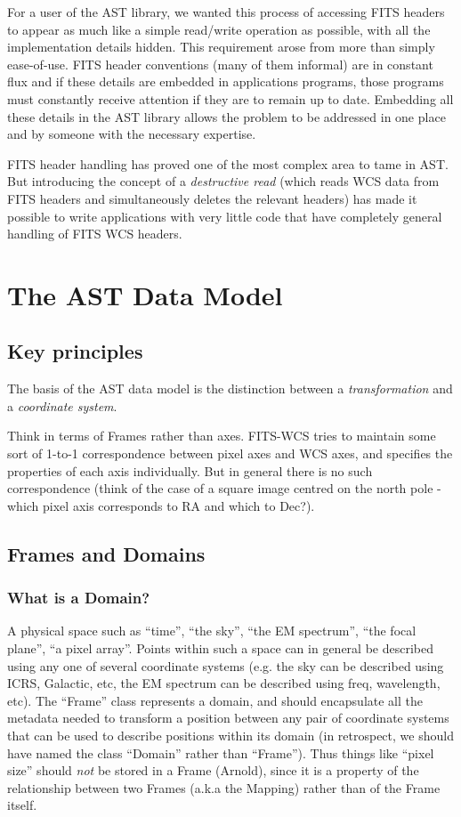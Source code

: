 \documentclass[final,authoryear,5p,times,twocolumn]{elsarticle}
\begin{document}
For a user of the AST library, we wanted this process of accessing FITS
headers to appear as much like a simple read/write operation as
possible, with all the implementation details hidden. This requirement
arose from more than simply ease-of-use. FITS header conventions (many
of them informal) are in constant flux and if these details are embedded
in applications programs, those programs must constantly receive
attention if they are to remain up to date. Embedding all these details
in the AST library allows the problem to be addressed in one place and
by someone with the necessary expertise.

FITS header handling has proved one of the most complex area to tame in AST.
But introducing the concept of a \emph{destructive read} (which reads WCS
data from FITS headers and simultaneously deletes the relevant headers)
has made it possible to write applications with very little code that
have completely general handling of FITS WCS headers.


\section{The AST Data Model}

\subsection{Key principles}

The basis of the AST data model is the distinction between a
\emph{transformation} and a \emph{coordinate system}.


Think in terms of Frames rather than axes. FITS-WCS tries to maintain
some sort of 1-to-1 correspondence between pixel axes and WCS axes,
and specifies the properties of each axis individually. But in general
there is no such correspondence (think of the case of a square image
centred on the north pole - which pixel axis corresponds to RA and
which to Dec?).

\subsection{Frames and Domains}

\subsubsection{What is a Domain?}

A physical space such as ``time'', ``the sky'', ``the EM spectrum'', ``the
focal plane'', ``a pixel array''. Points within such a space can in
general be described using any one of several coordinate systems
(e.g. the sky can be described using ICRS, Galactic, etc, the EM
spectrum can be described using freq, wavelength, etc). The ``Frame''
class represents a domain, and should encapsulate all the metadata
needed to transform a position between any pair of coordinate systems
that can be used to describe positions within its domain (in
retrospect, we should have named the class ``Domain'' rather than
``Frame''). Thus things like ``pixel size'' should \emph{not} be stored in a
Frame (Arnold), since it is a property of the relationship between two
Frames (a.k.a the Mapping) rather than of the Frame itself.
\end{document}
